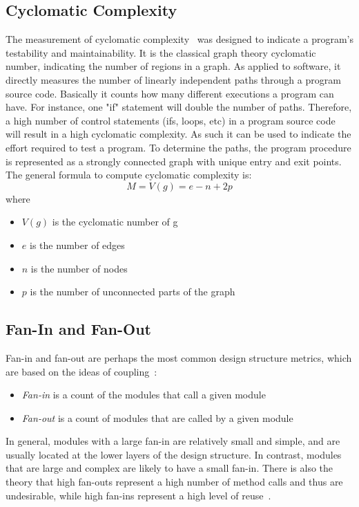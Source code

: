\subsection{Cyclomatic Complexity}
The measurement of cyclomatic complexity~\cite{mccabe1976complexity} was designed to indicate a program's testability and maintainability.
It is the classical graph theory cyclomatic number, indicating the number of regions in a graph.
As applied to software, it directly measures the number of linearly independent paths through a program source code.
Basically it counts how many different executions a program can have. 
For instance, one "if" statement will double the number of paths. 
Therefore, a high number of control statements (ifs, loops, etc) in a program source code will result in a high cyclomatic complexity. 
As such it can be used to indicate the effort required to test a program. To determine the paths, the program procedure is represented as a strongly connected graph with unique entry and exit points. The general formula to compute cyclomatic complexity is: 
$$M = V(g) = e - n + 2p$$
where
\begin{itemize}
\item \emph{$V(g)$} is the cyclomatic number of g 
\item \emph{$e$   } is the number of edges 
\item \emph{$n$   } is the number of nodes 
\item \emph{$p$   } is the number of unconnected parts of the graph 
\end{itemize}


\subsection{Fan-In and Fan-Out}
Fan-in and fan-out are perhaps the most common design structure metrics, which are based on the ideas of coupling~\cite{yourdon1979structured}:
\begin{itemize}
\item \emph{Fan-in } is a count of the modules that call a given module
\item \emph{Fan-out} is a count of modules that are called by a given module
\end{itemize}

In general, modules with a large fan-in are relatively small and simple, and are usually located at the lower layers of the design structure.
In contrast, modules that are large and complex are likely to have a small fan-in.
There is also the theory that high fan-outs represent a high number of method calls and thus are undesirable,
while high fan-ins represent a high level of reuse~\cite{wang2007dynamic}.

